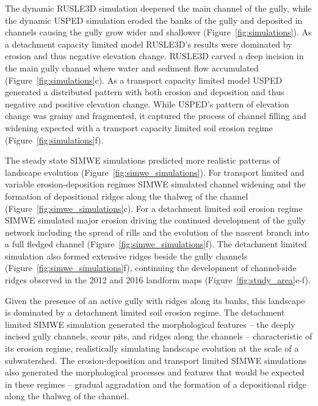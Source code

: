 \documentclass[gmd, manuscript]{copernicus}
\begin{document}
The dynamic RUSLE3D simulation
deepened the main channel of the gully,
while the dynamic USPED simulation
eroded the banks of the gully
and deposited in channels
causing the gully grow wider and shallower
(Figure~\ref{fig:simulations}). 
%
As a detachment capacity limited model
RUSLE3D's results were
dominated by erosion and 
thus negative elevation change.
%
RUSLE3D carved a deep incision 
in the main gully channel
where water and sediment flow accumulated
(Figure~\ref{fig:simulations}c). 
%
As a transport capacity limited model
USPED generated a distributed pattern
with both erosion and deposition and thus
negative and positive elevation change. 
%
While USPED's pattern of elevation change
was grainy and fragmented, 
it captured the process of channel 
filling and widening expected with 
a transport capacity limited soil erosion regime
(Figure~\ref{fig:simulations}f). 

The steady state SIMWE simulations 
predicted more realistic patterns 
of landscape evolution
(Figure~\ref{fig:simwe_simulations}). 
%
For transport limited and
variable erosion-deposition regimes
SIMWE simulated
channel widening 
and the formation of depositional ridges
along the thalweg of the channel
(Figure~\ref{fig:simwe_simulations}c).
%
For a detachment limited soil erosion regime
SIMWE simulated major erosion
driving the continued development 
of the gully network
including the spread of rills and
the evolution of the nascent branch
into a full fledged channel
(Figure~\ref{fig:simwe_simulations}f). 
%
The detachment limited simulation
also formed extensive ridges
beside the gully channels 
(Figure~\ref{fig:simwe_simulations}f), 
continuing the development of 
channel-side ridges
observed in the 2012 and 2016 landform maps
(Figure~\ref{fig:study_area}e-f). 

Given the presence of an active gully 
with ridges along its banks,
this landscape is dominated by 
a detachment limited soil erosion regime.
%
The detachment limited SIMWE simulation 
generated the morphological features
-- the deeply incised gully channels, 
scour pits,
and ridges along the channels 
--
characteristic of its erosion regime,
realistically simulating landscape evolution 
at the scale of a subwatershed. 
%
The erosion-deposition and transport limited 
SIMWE simulations also generated 
the morphological processes and features
that would be expected in these regimes
-- gradual aggradation
and the formation of a depositional ridge 
along the thalweg of the channel.
\end{document}
